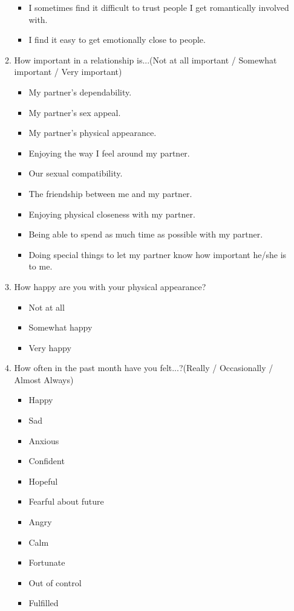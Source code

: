 \begin{appendices}
\begin{itemize}
\begin{enumerate}
\begin{itemize}
				\item I sometimes find it difficult to trust people I get romantically involved with.
				\item I find it easy to get emotionally close to people.		
			\end{itemize}
			\item How important in a relationship is...(Not at all important / Somewhat important / Very important)
			\begin{itemize}
				\item My partner's dependability.
				\item My partner's sex appeal.
				\item My partner's physical appearance.
				\item Enjoying the way I feel around my partner.
				\item Our sexual compatibility.
				\item The friendship between me and my partner.
				\item Enjoying physical closeness with my partner.
				\item Being able to spend as much time as possible with my partner.
				\item Doing special things to let my partner know how important he/she is to me.
			\end{itemize}
			\item How happy are you with your physical appearance?
			\begin{itemize}
				\item Not at all
				\item Somewhat happy
				\item Very happy
			\end{itemize}
			\item How often in the past month have you felt...?(Really / Occasionally / Almost Always)
			\begin{itemize}
				\item Happy
				\item Sad
				\item Anxious
				\item Confident
				\item Hopeful
				\item Fearful about future
				\item Angry
				\item Calm
				\item Fortunate
				\item Out of control
				\item Fulfilled

\end{itemize}
\end{enumerate}
\end{itemize}
\end{appendices}
